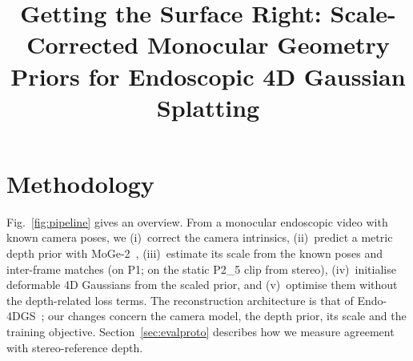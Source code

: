 \documentclass[conference]{IEEEtran}
\begin{document}
\title{Getting the Surface Right: Scale-Corrected Monocular Geometry Priors for Endoscopic 4D Gaussian Splatting}
\author{}
\maketitle

\setcounter{section}{2}
\section{Methodology}
\label{sec:method}

Fig.~\ref{fig:pipeline} gives an overview. From a monocular endoscopic video with known camera poses, we (i)~correct the camera intrinsics, (ii)~predict a metric depth prior with MoGe-2~\cite{wang2025moge2}, (iii)~estimate its scale from the known poses and inter-frame matches (on P1; on the static P2\_5 clip from stereo), (iv)~initialise deformable 4D Gaussians from the scaled prior, and (v)~optimise them without the depth-related loss terms. The reconstruction architecture is that of Endo-4DGS~\cite{huang2024endo4dgs,wu2024_4dgs}; our changes concern the camera model, the depth prior, its scale and the training objective. Section~\ref{sec:evalproto} describes how we measure agreement with stereo-reference depth.
\end{document}
